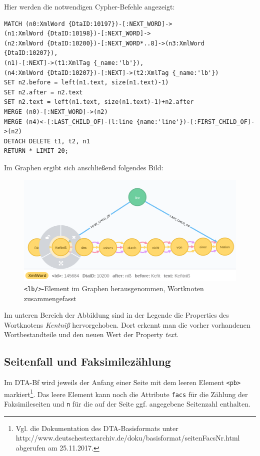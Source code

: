 \documentclass[ngerman,]{scrreprt}
\begin{document}
Hier werden die notwendigen Cypher-Befehle angezeigt:

\begin{verbatim}
MATCH (n0:XmlWord {DtaID:10197})-[:NEXT_WORD]->
(n1:XmlWord {DtaID:10198})-[:NEXT_WORD]->
(n2:XmlWord {DtaID:10200})-[:NEXT_WORD*..8]->(n3:XmlWord {DtaID:10207}),
(n1)-[:NEXT]->(t1:XmlTag {_name:'lb'}),
(n4:XmlWord {DtaID:10207})-[:NEXT]->(t2:XmlTag {_name:'lb'})
SET n2.before = left(n1.text, size(n1.text)-1)
SET n2.after = n2.text
SET n2.text = left(n1.text, size(n1.text)-1)+n2.after
MERGE (n0)-[:NEXT_WORD]->(n2)
MERGE (n4)<-[:LAST_CHILD_OF]-(l:line {name:'line'})-[:FIRST_CHILD_OF]->(n2)
DETACH DELETE t1, t2, n1
RETURN * LIMIT 20;
\end{verbatim}

Im Graphen ergibt sich anschließend folgendes Bild:

\begin{figure}
\centering
\includegraphics{Bilder/TEI2Graph/lb-Trennung-rausgenommen2.png}
\caption{\texttt{\textless{}lb/\textgreater{}}-Element im Graphen herausgenommen, Wortknoten zusammengefasst}
\end{figure}

Im unteren Bereich der Abbildung sind in der Legende die Properties des Wortknotens \emph{Kentniß} hervorgehoben. Dort erkennt man die vorher vorhandenen Wortbestandteile und den neuen Wert der Property \emph{text}.

\subsection{Seitenfall und Faksimilezählung}\label{seitenfall-und-faksimilezuxe4hlung}

Im DTA-Bf wird jeweils der Anfang einer Seite mit dem leeren Element \texttt{\textless{}pb\textgreater{}} markiert\footnote{Vgl. die Dokumentation des DTA-Basisformats unter http://www.deutschestextarchiv.de/doku/basisformat/seitenFacsNr.html abgerufen am 25.11.2017.}. Das leere Element kann noch die Attribute \texttt{facs} für die Zählung der Faksimileseiten und \texttt{n} für die auf der Seite ggf. angegebene Seitenzahl enthalten.
\end{document}
